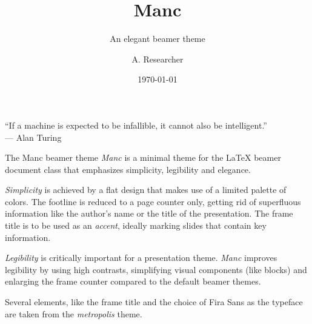 \documentclass[compress,aspectratio=1610]{beamer}
\title{Manc}
\subtitle{An elegant beamer theme}
\date{\today}
\author{A. Researcher}
\institute{Institute of Advanced Robotics}
\begin{document}
\begin{frame}
  \titlepage
\end{frame}

\begin{frame}
  \centering
  \begin{tcolorbox}[
    before skip=10mm,
    after skip=10mm,
    boxrule=2pt,
    sharp corners,
    fonttitle=\usebeamerfont{block title},
    fontupper=\usebeamerfont{block body},
    fontlower=\usebeamerfont{block body},
    boxsep=.5mm,
    parbox=false,
    width=26em,
  ]
    \enquote{If a machine is expected to be infallible, it cannot also be intelligent.}\\
    \hfill \textup{— Alan Turing}
  \end{tcolorbox}
\end{frame}

\begin{frame}{The Manc beamer theme}
  \emph{Manc} is a minimal theme for the \LaTeX{} beamer document class that emphasizes simplicity, legibility and elegance.

  \emph{Simplicity} is achieved by a flat design that makes use of a limited palette of colors. The footline is reduced to a page counter only, getting rid of superfluous information like the author's name or the title of the presentation.
  The frame title is to be used as an \emph{accent}, ideally marking slides that contain key information.

  \emph{Legibility} is critically important for a presentation theme.
  \emph{Manc} improves legibility by using high contrasts, simplifying visual components (like blocks) and enlarging the frame counter compared to the default beamer themes.

  Several elements, like the frame title and the choice of Fira Sans as the typeface are taken from the \emph{metropolis} theme.
\end{frame}
\end{document}
